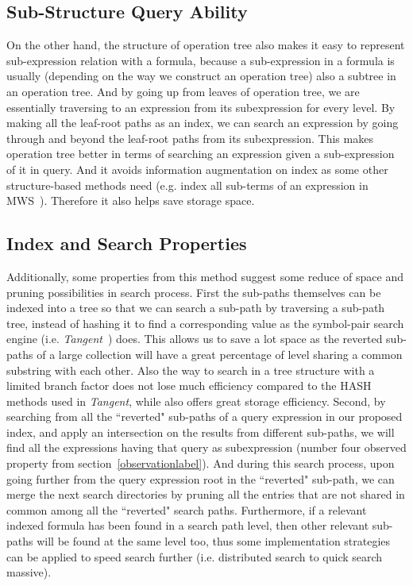 \subsection{Sub-Structure Query Ability}
On the other hand, the structure of operation tree also makes it easy to represent sub-expression relation with a formula, because a sub-expression in a formula is usually (depending on the way we construct an operation tree) also a subtree in an operation tree. 
And by going up from leaves of operation tree, we are essentially traversing to an expression from its subexpression for every level. 
By making all the leaf-root paths as an index, we can search an expression by going through and beyond the leaf-root paths from its subexpression. 
This makes operation tree better in terms of searching an expression given a sub-expression of it in query. 
And it avoids information augmentation on index as some other structure-based methods need (e.g. index all sub-terms of an expression in MWS~\cite{Kohlhase06}). Therefore it also helps save storage space. 

\subsection{Index and Search Properties}
Additionally, some properties from this method suggest some reduce of space and pruning possibilities in search process. 
First the sub-paths themselves can be indexed into a tree so that we can search a sub-path by traversing a sub-path tree, instead of hashing it to find a corresponding value as the symbol-pair search engine (i.e. \textit{Tangent}~\cite{symbolpairs15}) does. 
This allows us to save a lot space as the reverted sub-paths of a large collection will have a great percentage of level sharing a common substring with each other. 
Also the way to search in a tree structure with a limited branch factor does not lose much efficiency compared to the HASH methods used in \textit{Tangent}, while also offers great storage efficiency.
Second, by searching from all the ``reverted" sub-paths of a query expression in our proposed index, and apply an intersection on the results from different sub-paths, we will find all the expressions having that query as subexpression (number four observed property from section~\ref{observationlabel}). And during this search process, upon going further from the query expression root in the ``reverted" sub-path, we can merge the next search directories by pruning all the entries that are not shared in common among all the ``reverted" search paths. 
Furthermore, if a relevant indexed formula has been found in a search path level, then other relevant sub-paths will be found at the same level too, thus some implementation strategies can be applied to speed search further (i.e. distributed search to quick search massive).


